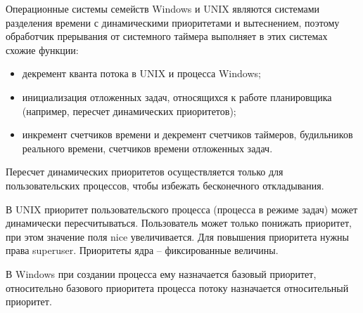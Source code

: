 \documentclass[a4paper,oneside,14pt]{extarticle}
\begin{document}

Операционные системы семейств Windows и UNIX являются системами разделения времени с динамическими приоритетами и вытеснением, поэтому обработчик прерывания от системного таймера выполняет в этих системах схожие функции: 
\begin{itemize}
    \item декремент кванта потока в UNIX и процесса Windows;
	\item инициализация отложенных задач, относящихся к работе планировщика (например, пересчет динамических приоритетов);
	\item инкремент счетчиков времени и декремент счетчиков таймеров, будильников реального времени, счетчиков времени отложенных задач.
	
\end{itemize}

Пересчет динамических приоритетов осуществляется только для пользовательских процессов, чтобы избежать бесконечного откладывания.

В UNIX приоритет пользовательского процесса (процесса в режиме задач) может динамически пересчитываться. Пользователь может только понижать приоритет, при этом значение поля nice увеличивается. Для повышения приоритета нужны права superuser. Приоритеты ядра -- фиксированные величины.

В Windows при создании процесса ему назначается базовый приоритет, относительно базового приоритета процесса потоку назначается относительный приоритет.

\newpage

% 
% 
\end{document}
